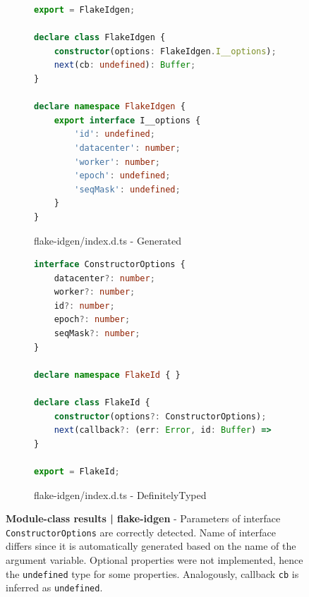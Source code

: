\documentclass[a4paper,english,cleveref, autoref]{lipics-v2019}
\begin{document}
\begin{figure}[tp]
    \centering
    \begin{subfigure}{0.48\linewidth}
      \begin{lstlisting}[language=TypeScript]
export = FlakeIdgen;

declare class FlakeIdgen {
    constructor(options: FlakeIdgen.I__options);
    next(cb: undefined): Buffer;
}

declare namespace FlakeIdgen {
    export interface I__options {
        'id': undefined;
        'datacenter': number;
        'worker': number;
        'epoch': undefined;
        'seqMask': undefined;
    }
}
      \end{lstlisting}
      \caption{flake-idgen/index.d.ts - Generated}
    \end{subfigure}
    \hfill
    \begin{subfigure}{0.48\linewidth}
      \begin{lstlisting}[language=TypeScript]
interface ConstructorOptions {
    datacenter?: number;
    worker?: number;
    id?: number;
    epoch?: number;
    seqMask?: number;
}

declare namespace FlakeId { }

declare class FlakeId {
    constructor(options?: ConstructorOptions);
    next(callback?: (err: Error, id: Buffer) => void): Buffer;
}

export = FlakeId;        
      \end{lstlisting}
      \caption{flake-idgen/index.d.ts - DefinitelyTyped}
    \end{subfigure}

    \caption{\textbf{Module-class results | flake-idgen} - Parameters of interface \texttt{ConstructorOptions} are correctly detected. Name of interface differs since it is automatically generated based on the name of the argument variable. Optional properties were not implemented, hence the \lstinline{undefined} type for some properties. Analogously, callback \texttt{cb} is inferred as \lstinline{undefined}.}
    \label{fig:experiments-results-module-class-flake-idgen}
\end{figure}
\end{document}
